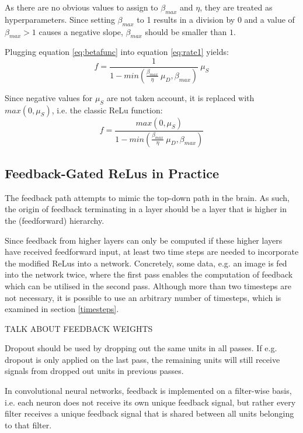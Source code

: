 \documentclass{article}
\begin{document}
As there are no obvious values to assign to $\beta_{max}$ and $\eta$, they are treated as hyperparameters. Since setting $\beta_{max}$ to 1 results in a division by $0$ and a value of $\beta_{max} > 1$ causes a negative slope, $\beta_{max}$ should be smaller than $1$. 

Plugging equation \ref{eq:betafunc} into equation \ref{eq:rate1} yields: 
\begin{equation}
	f = \frac{1}{1 - min(\frac{\beta_{max}}{\eta} \ \mu_D, \beta_{max})} \ \mu_S 
\end{equation}

Since negative values for $\mu_S$ are not taken account, it is replaced with $max(0, \mu_S)$, i.e. the classic ReLu function: 
\begin{equation}
\label{eq:fgrelu}
		f = \frac{max(0, \mu_S)}{1 - min(\frac{\beta_{max}}{\eta} \ \mu_D, \beta_{max})} 
\end{equation}

\subsection{Feedback-Gated ReLus in Practice}
The feedback path attempts to mimic the top-down path in the brain. As such, the origin of feedback terminating in a layer should be a layer that is higher in the (feedforward) hierarchy. 

Since feedback from higher layers can only be computed if these higher layers have received feedforward input, at least two time steps are needed to incorporate the modified ReLus into a network. Concretely, some data, e.g. an image is fed into the network twice, where the first pass enables the computation of feedback which can be utilised in the second pass. 
	Although more than two timesteps are not necessary, it is possible to use an arbitrary number of timesteps, which is examined in section \ref{timesteps}.
	
	TALK ABOUT FEEDBACK WEIGHTS 
	
Dropout \cite{srivastava2014dropout} should be used by dropping out the same units in all passes.  
If e.g. dropout is only applied on the last pass, the remaining units will still receive signals from dropped out units in previous passes.

In convolutional neural networks, feedback is implemented on a filter-wise basis, i.e. each neuron does not receive its own unique feedback signal, but rather every filter receives a unique feedback signal that is shared between all units belonging to that filter. 
\end{document}
